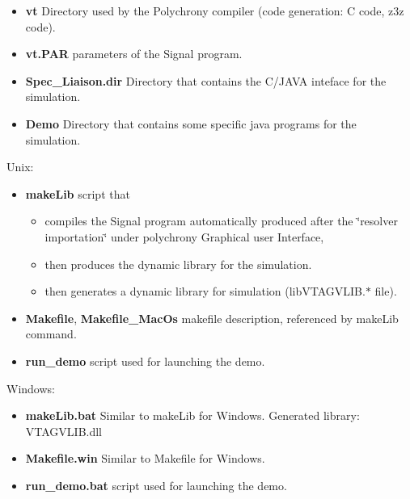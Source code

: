 \begin{itemize}
\item {\bf vt} Directory used by the Polychrony compiler (code generation: C code, z3z code).\end{itemize}


\begin{itemize}
\item {\bf vt.PAR} parameters of the Signal program.\end{itemize}


\begin{itemize}
\item {\bf Spec\_\-Liaison.dir} Directory that contains the C/JAVA inteface for the simulation.\end{itemize}


\begin{itemize}
\item {\bf Demo} Directory that contains some specific java programs for the simulation.\end{itemize}


Unix:\begin{itemize}
\item {\bf make\-Lib} script that\begin{itemize}
\item compiles the Signal program automatically produced after the \char`\"{}resolver importation\char`\"{} under polychrony Graphical user Interface,\item then produces the dynamic library for the simulation.\item then generates a dynamic library for simulation (lib\-VTAGVLIB.$\ast$ file).\end{itemize}
\item {\bf Makefile}, {\bf Makefile\_\-Mac\-Os} makefile description, referenced by make\-Lib command.\item {\bf run\_\-demo} script used for launching the demo.\end{itemize}


Windows:\begin{itemize}
\item {\bf make\-Lib.bat} Similar to make\-Lib for Windows. Generated library: VTAGVLIB.dll\item {\bf Makefile.win} Similar to Makefile for Windows.\item {\bf run\_\-demo.bat} script used for launching the demo.\end{itemize}
